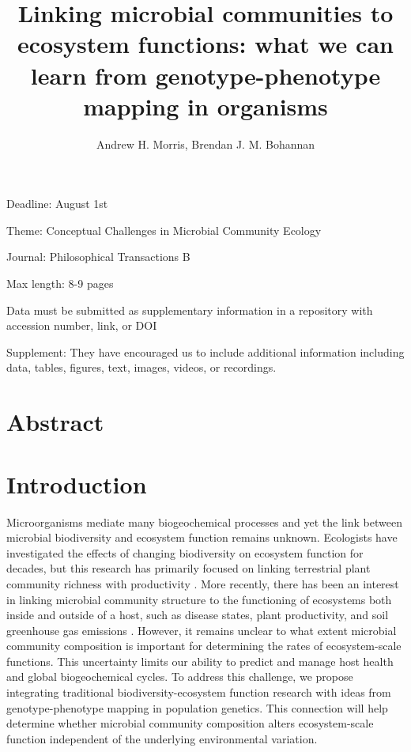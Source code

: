 \documentclass{article}
\title{Linking microbial communities to ecosystem functions: what we can learn
from genotype-phenotype mapping in organisms}
\author{Andrew H. Morris, Brendan J. M. Bohannan}
\begin{document}
\maketitle



Deadline: August 1st

Theme: Conceptual Challenges in Microbial Community Ecology

Journal: Philosophical Transactions B

Max length: 8-9 pages

Data must be submitted as supplementary information in a repository with
accession number, link, or DOI

Supplement: They have encouraged us to include additional information including
data, tables, figures, text, images, videos, or recordings.

\section*{Abstract}



\section{Introduction} 

Microorganisms mediate many biogeochemical processes and yet the link between
microbial biodiversity and ecosystem function remains unknown. 
Ecologists have investigated the effects of changing
biodiversity on ecosystem function for decades, but this research has primarily
focused on linking terrestrial plant community richness with productivity
\citep{hooper2005}. More recently, there has been an interest in linking
microbial community structure to the functioning of ecosystems both inside and
outside of a host, such as disease states, plant productivity,
and soil greenhouse gas emissions \citep{schimel1998, singh2010}. 
However, it remains unclear to what extent 
microbial community composition is important for determining the rates of ecosystem-scale
functions.  This uncertainty limits our ability to predict and manage host
health and global biogeochemical cycles. To
address this challenge, we propose integrating traditional
biodiversity-ecosystem function research with ideas from genotype-phenotype
mapping in population genetics. This connection will help determine
whether microbial community
composition alters ecosystem-scale function independent
of the underlying environmental variation.
\end{document}
